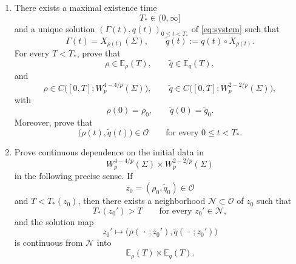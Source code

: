 \documentclass[10pt,a4paper]{article}
\theoremstyle{definition}
\newcommand{\Erho}{\mathbb E_{\rho}}
\newcommand{\Eq}{\mathbb E_{q}}
\begin{document}
\begin{enumerate}
  \item There exists a maximal existence time
  \begin{equation}
    T_*\in(0,\infty]
  \end{equation}
  and a unique solution $(\Gamma(t),q(t))_{0\leq t<T_*}$ of
  \eqref{eq:system} such that
  \begin{equation}
    \Gamma(t)=X_{\rho(t)}(\Sigma),
    \qquad
    \widetilde q(t):=q(t)\circ X_{\rho(t)}.
  \end{equation}
  For every $T<T_*$, prove that
  \begin{equation}
    \rho\in\Erho(T),
    \qquad
    \widetilde q\in\Eq(T),
  \end{equation}
  and
  \begin{equation}
    \rho\in C\bigl([0,T];W_p^{4-4/p}(\Sigma)\bigr),
    \qquad
    \widetilde q\in C\bigl([0,T];W_p^{2-2/p}(\Sigma)\bigr),
  \end{equation}
  with
  \begin{equation}
    \rho(0)=\rho_0,
    \qquad
    \widetilde q(0)=\widetilde q_0.
  \end{equation}
  Moreover, prove that
  \begin{equation}
    \bigl(\rho(t),\widetilde q(t)\bigr)\in\mathcal O
    \qquad\text{for every }0\leq t<T_*.
  \end{equation}

  \item Prove continuous dependence on the initial data in
  \begin{equation}
    W_p^{4-4/p}(\Sigma)\times W_p^{2-2/p}(\Sigma)
  \end{equation}
  in the following precise sense. If
  \begin{equation}
    z_0=(\rho_0,\widetilde q_0)\in\mathcal O
  \end{equation}
  and $T<T_*(z_0)$, then there exists a neighborhood
  $\mathcal N\subset\mathcal O$ of $z_0$ such that
  \begin{equation}
    T_*(z_0')>T
    \qquad\text{for every }z_0'\in\mathcal N,
  \end{equation}
  and the solution map
  \begin{equation}
    z_0'
    \longmapsto
    \bigl(
      \rho(\,\cdot\,;z_0'),
      \widetilde q(\,\cdot\,;z_0')
    \bigr)
  \end{equation}
  is continuous from $\mathcal N$ into
  \begin{equation}
    \Erho(T)\times\Eq(T).
  \end{equation}


\end{enumerate}
\end{document}
